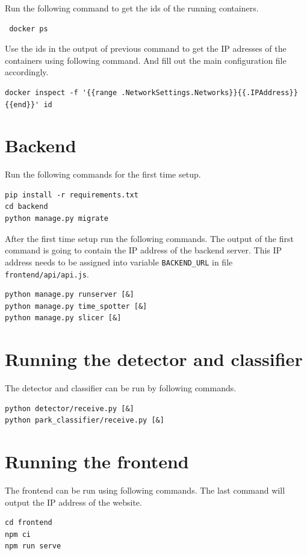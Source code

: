 \documentclass[thesis=M,english]{FITthesis}[2019/03/06]
\begin{document}
Run the following command to get the ids of the running containers.
\begin{verbatim}
 docker ps
\end{verbatim}

Use the ids in the output of previous command to get the IP adresses of the containers using following command. And fill out the main configuration file accordingly.
\begin{verbatim}
docker inspect -f '{{range .NetworkSettings.Networks}}{{.IPAddress}}{{end}}' id
\end{verbatim}

\section{Backend}
Run the following commands for the first time setup.
\begin{verbatim}
pip install -r requirements.txt
cd backend
python manage.py migrate
\end{verbatim}

After the first time setup run the following commands. The output of the first command is going to contain the IP address of the backend server. This IP address needs to be assigned into variable \texttt{BACKEND_URL} in file  \texttt{frontend/api/api.js}.

\begin{verbatim}
python manage.py runserver [&]
python manage.py time_spotter [&]
python manage.py slicer [&]
\end{verbatim}

\section{Running the detector and classifier}
The detector and classifier can be run by following commands.
\begin{verbatim}
python detector/receive.py [&]
python park_classifier/receive.py [&]
\end{verbatim}

\section{Running the frontend}
The frontend can be run using following commands. The last command will output the IP address of the website.
\begin{verbatim}
cd frontend
npm ci
npm run serve
\end{verbatim}
\end{document}
